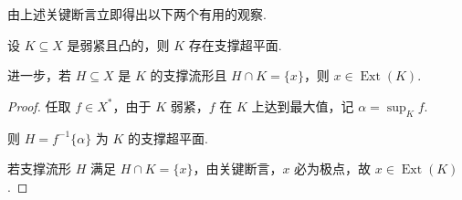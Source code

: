 由上述关键断言立即得出以下两个有用的观察.

\begin{corollary}[]
设 $K\subseteq X$ 是弱紧且凸的，则 $K$ 存在支撑超平面.\par
进一步，若 $H\subseteq X$ 是 $K$ 的支撑流形且 $H\cap K = \{x\}$，则 $x\in \operatorname{Ext}(K)$.
\end{corollary}
\begin{proof}
任取 $f\in X^*$，由于 $K$ 弱紧，$f$ 在 $K$ 上达到最大值，记 $\alpha = \sup_K f$.\par
则 $H = f^{-1}\{\alpha\}$ 为 $K$ 的支撑超平面.\par
若支撑流形 $H$ 满足 $H\cap K = \{x\}$，由关键断言，$x$ 必为极点，故 $x\in \operatorname{Ext}(K)$.
\end{proof}


